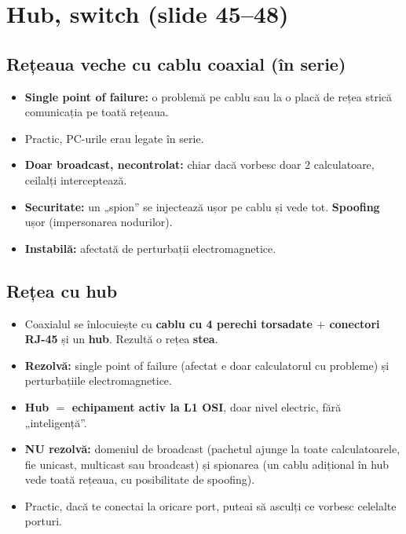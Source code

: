 \documentclass[11pt,a4paper]{article}
\begin{document}

\section{Hub, switch (slide 45--48)}

\subsection*{Rețeaua veche cu cablu coaxial (în serie)}
\begin{itemize}
  \item \textbf{Single point of failure:} o problemă pe cablu sau la o placă de rețea strică comunicația pe toată rețeaua.
  \item Practic, PC-urile erau legate în serie.
  \item \textbf{Doar broadcast, necontrolat:} chiar dacă vorbesc doar 2 calculatoare, ceilalți interceptează.
  \item \textbf{Securitate:} un „spion” se injectează ușor pe cablu și vede tot. \textbf{Spoofing} ușor (impersonarea nodurilor).
  \item \textbf{Instabilă:} afectată de perturbații electromagnetice.
\end{itemize}

\subsection*{Rețea cu hub}
\begin{itemize}
  \item Coaxialul se înlocuiește cu \textbf{cablu cu 4 perechi torsadate $+$ conectori RJ-45} și un \textbf{hub}. Rezultă o rețea \textbf{stea}.
  \item \textbf{Rezolvă:} single point of failure (afectat e doar calculatorul cu probleme) și perturbațiile electromagnetice.
  \item \textbf{Hub $=$ echipament activ la L1 OSI}, doar nivel electric, fără „inteligență”.
  \item \textbf{NU rezolvă:} domeniul de broadcast (pachetul ajunge la toate calculatoarele, fie unicast, multicast sau broadcast) și spionarea (un cablu adițional în hub vede toată rețeaua, cu posibilitate de spoofing).
  \item Practic, dacă te conectai la oricare port, puteai să asculți ce vorbesc celelalte porturi.
\end{itemize}
\end{document}
